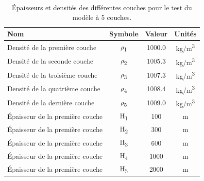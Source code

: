 \documentclass[10pt]{article}
\numberwithin{equation}{section}
\begin{document}
\begin{table}[htbp]
\caption{\label{tab:org2e4409e}Épaisseurs et densités des différentes couches pour le test du modèle à 5 couches.}
\centering
\begin{tabular}{lccc}
\hline
\hline
Nom & Symbole & Valeur & Unités\\
\hline
Densité de la première couche & \(\rho\)\textsubscript{1} & 1000.0 & kg/m\textsuperscript{3}\\
Densité de la seconde couche & \(\rho\)\textsubscript{2} & 1005.3 & kg/m\textsuperscript{3}\\
Densité de la troisième couche & \(\rho\)\textsubscript{3} & 1007.3 & kg/m\textsuperscript{3}\\
Densité de la quatrième couche & \(\rho\)\textsubscript{4} & 1008.4 & kg/m\textsuperscript{3}\\
Densité de la dernière couche & \(\rho\)\textsubscript{5} & 1009.0 & kg/m\textsuperscript{3}\\
\hline
Épaisseur de la première couche & H\textsubscript{1} & 100 & m\\
Épaisseur de la première couche & H\textsubscript{2} & 300 & m\\
Épaisseur de la première couche & H\textsubscript{3} & 600 & m\\
Épaisseur de la première couche & H\textsubscript{4} & 1000 & m\\
Épaisseur de la première couche & H\textsubscript{5} & 2000 & m\\
\hline
\end{tabular}
\end{table}





\printbibliography
\end{document}
